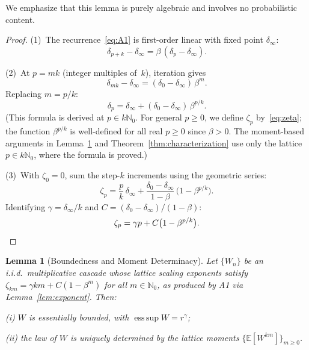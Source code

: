 \documentclass[pdflatex,sn-mathphys-num]{sn-jnl}
\theoremstyle{thmstyleone}
\newtheorem{lemma}[theorem]{Lemma}
\theoremstyle{thmstyletwo}
\theoremstyle{thmstylethree}
\DeclareMathOperator*{\esssup}{ess\,sup}
\begin{document}
We emphasize that this lemma is purely algebraic and involves no
probabilistic content.

\begin{proof}
(1)~The recurrence~\eqref{eq:A1} is first-order linear with fixed
point $\delta_\infty$:
\[
  \delta_{p+k} - \delta_\infty = \beta\,(\delta_p - \delta_\infty).
\]

(2)~At $p = mk$ (integer multiples of~$k$), iteration gives
\[
  \delta_{mk} - \delta_\infty
  = (\delta_0 - \delta_\infty)\,\beta^m.
\]
Replacing $m = p/k$:
\[
  \delta_p
  = \delta_\infty + (\delta_0 - \delta_\infty)\,\beta^{p/k}.
\]
(This formula is derived at $p \in k\mathbb{N}_0$.  For general $p
\geq 0$, we define $\zeta_p$ by~\eqref{eq:zeta}; the function
$\beta^{p/k}$ is well-defined for all real $p \geq 0$ since $\beta >
0$.  The moment-based arguments in Lemma~\ref{lem:determinacy} and
Theorem~\ref{thm:characterization} use only the lattice
$p \in k\mathbb{N}_0$, where the formula is proved.)

(3)~With $\zeta_0 = 0$, sum the step-$k$ increments using the
geometric series:
\[
  \zeta_p
  = \frac{p}{k}\,\delta_\infty
    + \frac{\delta_0 - \delta_\infty}{1 - \beta}\,
      \bigl(1 - \beta^{p/k}\bigr).
\]
Identifying $\gamma = \delta_\infty/k$ and $C = (\delta_0 -
\delta_\infty)/(1-\beta)$:
\[
  \zeta_p = \gamma p + C\bigl(1 - \beta^{p/k}\bigr).  \qedhere
\]
\end{proof}


\begin{lemma}[Boundedness and Moment Determinacy]\label{lem:determinacy}
Let $\{W_n\}$ be an i.i.d.\ multiplicative cascade whose lattice
scaling exponents satisfy
$\zeta_{km} = \gamma km + C(1-\beta^{m})$ for all $m \in
\mathbb{N}_0$, as produced by A1 via Lemma~\ref{lem:exponent}.  Then:

\textup{(i)} $W$ is essentially bounded, with $\esssup W =
r^{\gamma}$;

\textup{(ii)} the law of $W$ is uniquely determined by the lattice
moments $\{\mathbb{E}[W^{km}]\}_{m \ge 0}$.
\end{lemma}
\end{document}
